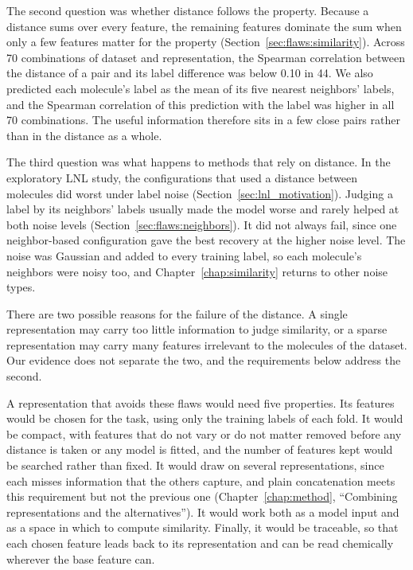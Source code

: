 The second question was whether distance follows the property. Because a distance sums over every feature, the remaining features dominate the sum when only a few features matter for the property (Section~\ref{sec:flaws:similarity}). Across 70 combinations of dataset and representation, the Spearman correlation between the distance of a pair and its label difference was below 0.10 in 44. %
We also predicted each molecule's label as the mean of its five nearest neighbors' labels, and the Spearman correlation of this prediction with the label was higher in all 70 combinations. The useful information therefore sits in a few close pairs rather than in the distance as a whole.

The third question was what happens to methods that rely on distance. In the exploratory LNL study, the configurations that used a distance between molecules did worst under label noise (Section~\ref{sec:lnl_motivation}). Judging a label by its neighbors' labels usually made the model worse and rarely helped at both noise levels (Section~\ref{sec:flaws:neighbors}). It did not always fail, since one neighbor-based configuration gave the best recovery at the higher noise level. The noise was Gaussian and added to every training label, so each molecule's neighbors were noisy too, and Chapter~\ref{chap:similarity} returns to other noise types.

There are two possible reasons for the failure of the distance. A single representation may carry too little information to judge similarity, or a sparse representation may carry many features irrelevant to the molecules of the dataset. Our evidence does not separate the two, and the requirements below address the second.

A representation that avoids these flaws would need five properties. Its features would be chosen for the task, using only the training labels of each fold. It would be compact, with features that do not vary or do not matter removed before any distance is taken or any model is fitted, and the number of features kept would be searched rather than fixed. It would draw on several representations, since each misses information that the others capture, and plain concatenation meets this requirement but not the previous one (Chapter~\ref{chap:method}, ``Combining representations and the alternatives''). It would work both as a model input and as a space in which to compute similarity. Finally, it would be traceable, so that each chosen feature leads back to its representation and can be read chemically wherever the base feature can.

